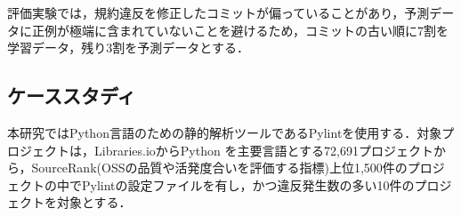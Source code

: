 \documentclass[uplatex,dvipdfmx,a4paper,twocolumn,base=11pt,jbase=11pt,ja=standard]{bxjsarticle}  %
\begin{document}
評価実験では，規約違反を修正したコミットが偏っていることがあり，予測データに正例が極端に含まれていないことを避けるため，コミットの古い順に7割を学習データ，残り3割を予測データとする．








\subsection{ケーススタディ}
本研究ではPython言語のための静的解析ツールであるPylintを使用する．対象プロジェクトは，Libraries.ioからPython を主要言語とする72,691プロジェクトから，SourceRank(OSSの品質や活発度合いを評価する指標)上位1,500件のプロジェクトの中でPylintの設定ファイルを有し，かつ違反発生数の多い10件のプロジェクトを対象とする．







%
\end{document}
